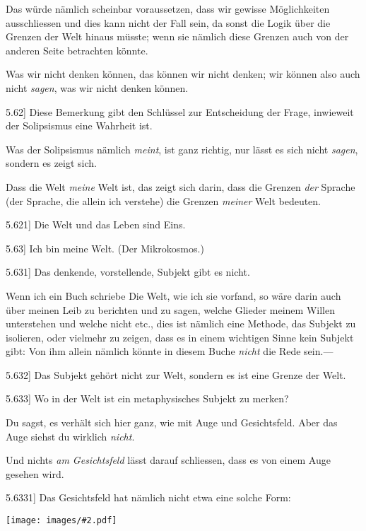 \documentclass[12pt,oneside]{book}[2007/10/19]
\newcommand{\PropERef}[1]{\hyperref[PropE:#1]{#1}}
\newcommand{\PropositionG}[2]{%
  \item[\phantomsection\label{PropG:#1}\PropERef{#1}] #2%
}
\newcommand{\Illustration}[2][0.3\textwidth]{%
  \begin{center}
  \texttt{[image: images/\#2.pdf]}
  \end{center}
}
\newcommand{\DPtypo}[2]{#2}
\newcommand{\Emph}[1]{\emph{#1}}%
\begin{document}
\begin{propositions}
{Das würde nämlich scheinbar voraussetzen, dass
\enlargethispage{9pt} %
wir gewisse Möglichkeiten ausschliessen und dies
kann nicht der Fall sein, da sonst die Logik
über die Grenzen der Welt hinaus müsste; wenn
sie nämlich diese Grenzen auch von der anderen
Seite betrachten könnte.

Was wir nicht denken können, das können wir
nicht denken; wir können also auch nicht \Emph{sagen},
was wir nicht denken können.}


\PropositionG{5.62}
{Diese Bemerkung gibt den Schlüssel zur
Entscheidung der Frage, inwieweit der Solipsismus
eine Wahrheit ist.

Was der Solipsismus nämlich \Emph{meint}, ist ganz
richtig, nur lässt es sich nicht \Emph{sagen}, sondern es
zeigt sich.

Dass die Welt \Emph{meine} Welt ist, das zeigt sich darin,
dass die Grenzen \Emph{der} Sprache (der Sprache, die allein
ich verstehe) die Grenzen \Emph{meiner} Welt bedeuten.}


\PropositionG{5.621}
{Die Welt und das Leben sind Eins.}


\PropositionG{5.63}
{Ich bin meine Welt. (Der Mikrokosmos.)}


\PropositionG{5.631}
{Das denkende, vorstellende, Subjekt gibt es nicht.

Wenn ich ein Buch schriebe \glqq{}Die Welt, wie ich
sie vorfand\grqq{}, so wäre darin auch über meinen Leib
zu berichten und zu sagen, welche Glieder meinem
Willen unterstehen und welche nicht etc., dies ist
nämlich eine Methode, das Subjekt zu isolieren,
oder vielmehr zu zeigen, dass es in einem wichtigen
Sinne kein Subjekt gibt: Von ihm allein nämlich
könnte in diesem Buche \Emph{nicht} die Rede sein.---}


\PropositionG{5.632}
{Das Subjekt gehört nicht zur Welt, sondern es
ist eine Grenze der Welt.}


\PropositionG{5.633}
{Wo in der Welt ist ein \DPtypo{methaphysisches}{metaphysisches} Subjekt
zu merken?

Du sagst, es verhält sich hier ganz, wie mit Auge
und Gesichtsfeld. Aber das Auge siehst du wirklich
\Emph{nicht}.

Und nichts \Emph{am Gesichtsfeld} lässt darauf
schliessen, dass es von einem Auge gesehen wird.}


\PropositionG{5.6331}
{Das Gesichtsfeld hat nämlich nicht etwa eine
solche Form:
\Illustration{sight-de}
}



\end{propositions}
\end{document}
